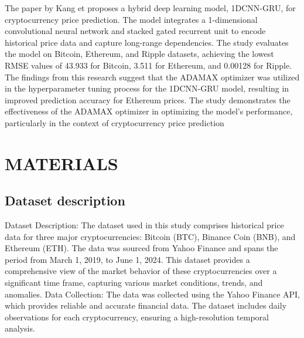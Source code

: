 \documentclass{ieeeojies}
\begin{document}
The paper by Kang et \cite{phi} proposes a hybrid deep learning model, 1DCNN-GRU, for cryptocurrency price prediction. The model integrates a 1-dimensional convolutional neural network and stacked gated recurrent unit to encode historical price data and capture long-range dependencies. The study evaluates the model on Bitcoin, Ethereum, and Ripple datasets, achieving the lowest RMSE values of 43.933 for Bitcoin, 3.511 for Ethereum, and 0.00128 for Ripple. The findings from this research suggest that the ADAMAX optimizer was utilized in the hyperparameter tuning process for the 1DCNN-GRU model, resulting in improved prediction accuracy for Ethereum prices. The study demonstrates the effectiveness of the ADAMAX optimizer in optimizing the model's performance, particularly in the context of cryptocurrency price prediction
\section{MATERIALS}
\subsection{Dataset description}
Dataset Description: The dataset used in this study comprises historical price data for three major cryptocurrencies: Bitcoin (BTC), Binance Coin (BNB), and Ethereum (ETH). The data was sourced from Yahoo Finance and spans the period from March 1, 2019, to June 1, 2024. This dataset provides a comprehensive view of the market behavior of these cryptocurrencies over a significant time frame, capturing various market conditions, trends, and anomalies.
Data Collection: The data was collected using the Yahoo Finance API, which provides reliable and accurate financial data. The dataset includes daily observations for each cryptocurrency, ensuring a high-resolution temporal analysis.
\end{document}
